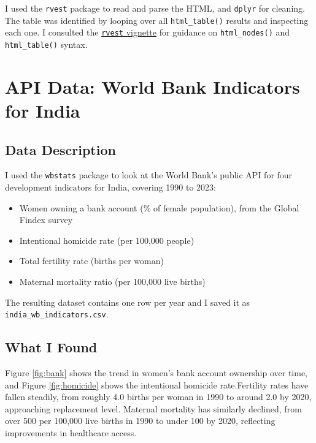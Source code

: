 \documentclass[12pt]{article}
\begin{document}
I used the \texttt{rvest} package to read and parse the HTML, and \texttt{dplyr} for cleaning. The table was identified by looping over all \texttt{html\_table()} results and inspecting each one. I consulted the \href{https://rvest.tidyverse.org/articles/rvest.html}{\texttt{rvest} vignette} for guidance on \texttt{html\_nodes()} and \texttt{html\_table()} syntax.


\section{API Data: World Bank Indicators for India}

\subsection*{Data Description}

I used the \texttt{wbstats} package to look at the World Bank's public API for four development indicators for India, covering 1990 to 2023:

\begin{itemize}
  \item Women owning a bank account (\% of female population), from the Global Findex survey
  \item Intentional homicide rate (per 100,000 people)
  \item Total fertility rate (births per woman)
  \item Maternal mortality ratio (per 100,000 live births)
\end{itemize}

The resulting dataset contains one row per year and I saved it as \texttt{india\_wb\_indicators.csv}.

\subsection*{What I Found}

Figure \ref{fig:bank} shows the trend in women's bank account ownership over time,
and Figure \ref{fig:homicide} shows the intentional homicide rate.Fertility rates have fallen steadily, from roughly 4.0 births per woman in 1990 to around 2.0 by 2020, approaching replacement level. Maternal mortality has similarly
declined, from over 500 per 100,000 live births in 1990 to under 100 by
2020, reflecting improvements in healthcare access.
\end{document}
